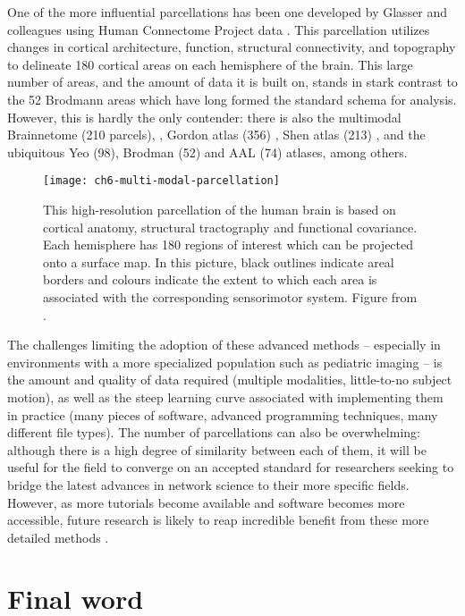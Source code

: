 One of the more influential parcellations has been one developed by Glasser and colleagues using Human Connectome Project data \citep{Glasser2016}. This parcellation utilizes changes in cortical architecture, function, structural connectivity, and topography to delineate 180 cortical areas on each hemisphere of the brain. This large number of areas, and the amount of data it is built on, stands in stark contrast to the 52 Brodmann areas which have long formed the standard schema for analysis. However, this is hardly the only contender: there is also the multimodal Brainnetome (210 parcels), \citep{Fan2016}, Gordon atlas (356) \citep{Gordon2016}, Shen atlas (213) \citep{Shen2013}, and the ubiquitous Yeo (98), Brodman (52) and AAL (74) atlases, among others. 

\begin{figure}[t]
	\centering
	\texttt{[image: ch6-multi-modal-parcellation]}
	\caption[Multi-modal parcellation of the human brain]{This high-resolution parcellation of the human brain is based on cortical anatomy, structural tractography and functional covariance. Each hemisphere has 180 regions of interest which can be projected onto a surface map. In this picture, black outlines indicate areal borders and colours indicate the extent to which each area is associated with the corresponding sensorimotor system. Figure from \citep{Glasser2016}.}
	\label{fig:ch6-multi-modal-parcellation}
\end{figure}

The challenges limiting the adoption of these advanced methods -- especially in environments with a more specialized population such as pediatric imaging -- is the amount and quality of data required (multiple modalities, little-to-no subject motion), as well as the steep learning curve associated with implementing them in practice (many pieces of software, advanced programming techniques, many different file types). The number of parcellations can also be overwhelming: although there is a high degree of similarity between each of them, it will be useful for the field to converge on an accepted standard for researchers seeking to bridge the latest advances in network science to their more specific fields. However, as more tutorials become available and software becomes more accessible, future research is likely to reap incredible benefit from these more detailed methods \citep{Poldrack2015}.

\section{Final word}

